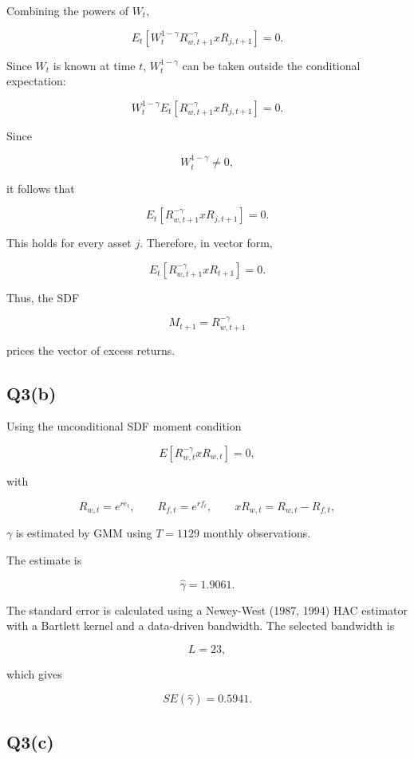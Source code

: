 \documentclass{article}
\begin{document}
Combining the powers of \(W_t\),

\[
E_t
\left[
W_t^{1-\gamma}
R_{w,t+1}^{-\gamma}
xR_{j,t+1}
\right]
=
0.
\]

Since \(W_t\) is known at time \(t\), \(W_t^{1-\gamma}\) can be taken outside the conditional expectation:

\[
W_t^{1-\gamma}
E_t
\left[
R_{w,t+1}^{-\gamma}
xR_{j,t+1}
\right]
=
0.
\]

Since

\[
W_t^{1-\gamma}\neq 0,
\]

it follows that

\[
E_t
\left[
R_{w,t+1}^{-\gamma}
xR_{j,t+1}
\right]
=
0.
\]

This holds for every asset \(j\). Therefore, in vector form,

\[
\boxed{
E_t
\left[
R_{w,t+1}^{-\gamma}
xR_{t+1}
\right]
=
0.
}
\]

Thus, the SDF

\[
\boxed{
M_{t+1}
=
R_{w,t+1}^{-\gamma}
}
\]

prices the vector of excess returns.




\subsection{Q3(b)}

Using the unconditional SDF moment condition

\[
E\left[R_{w,t}^{-\gamma}xR_{w,t}\right]=0,
\]

with

\[
R_{w,t}=e^{re_t},
\qquad
R_{f,t}=e^{rf_t},
\qquad
xR_{w,t}=R_{w,t}-R_{f,t},
\]

\(\gamma\) is estimated by GMM using \(T=1129\) monthly observations.

The estimate is

\[
\hat{\gamma}=1.9061.
\]

The standard error is calculated using a Newey-West (1987, 1994) HAC estimator with a Bartlett kernel and a data-driven bandwidth. The selected bandwidth is

\[
L=23,
\]

which gives

\[
SE(\hat{\gamma})=0.5941.
\]

\subsection{Q3(c)}
\end{document}
